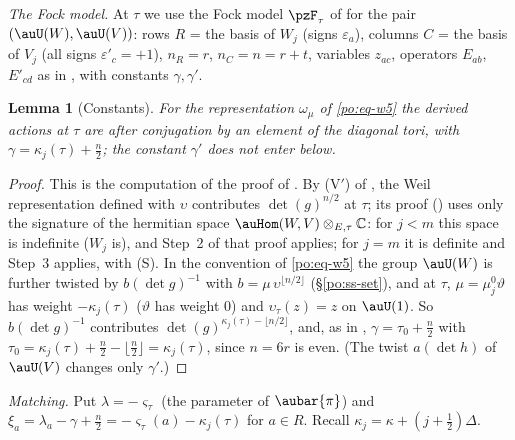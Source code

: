 \documentclass[10pt]{amsart}
\newtheorem{lemma}[theorem]{Lemma}
\theoremstyle{definition}
\theoremstyle{remark}
\newcommand{\C}{\mathbb C}
\begin{document}
\emph{The Fock model.} At $\tau$ we use the Fock model $\pzF_\tau$ of {\cite[\S3.1.4]{P49}} for the
pair $(\auU(W),\auU(V))$: rows $R$ = the basis of $W_j$ (signs $\varepsilon_a$), columns $C$ = the
basis of $V_j$ (all signs $\varepsilon'_c=+1$), $n_R=r$, $n_C=n=r+t$, variables $z_{ac}$, operators
$E_{ab}$, $E'_{cd}$ as in {\cite[(12)]{P49}}, with constants $\gamma,\gamma'$.

\begin{lemma}[Constants]\label{plf:const}
For the representation $\omega_\mu$ of \eqref{po:eq-w5} the derived actions at $\tau$ are
{\cite[(12)]{P49}} after conjugation by an element of the diagonal tori, with
$\gamma=\kappa_j(\tau)+\frac n2$; the constant $\gamma'$ does not enter below.
\end{lemma}
\begin{proof}
This is the computation of the proof of {\cite[Lemma~3.6]{P49}}. By (V$'$) of {\cite[\S3.2.7]{P49}}, the
Weil representation defined with $\upsilon$ contributes $\det(g)^{n/2}$ at $\tau$; its proof
({\cite[Theorem~3.29]{P49}}) uses only the signature of the hermitian space $\auHom(W,V)\otimes_{E,\tau}\C$:
for $j<m$ this space is indefinite ($W_j$ is), and Step~2 of that proof applies; for $j=m$ it is
definite and Step~3 applies, with (S). In the convention of \eqref{po:eq-w5} the group $\auU(W)$ is
further twisted by $b(\det g)^{-1}$ with $b=\mu\,\upsilon^{\lfloor n/2\rfloor}$ (\S\ref{po:ss-set}),
and at $\tau$, $\mu=\mu^0_j\vartheta$ has weight $-\kappa_j(\tau)$ ($\vartheta$ has weight $0$) and
$\upsilon_\tau(z)=z$ on $\auU(1)$. So $b(\det g)^{-1}$ contributes $\det(g)^{\kappa_j(\tau)-\lfloor n/2\rfloor}$, and, as in
{\cite[Lemma~3.6]{P49}}, $\gamma=\tau_0+\frac n2$ with $\tau_0=\kappa_j(\tau)+\frac n2-\lfloor\frac
n2\rfloor=\kappa_j(\tau)$, since $n=6r$ is even. (The twist $a(\det h)$ of $\auU(V)$ changes only
$\gamma'$.)
\end{proof}

\emph{Matching.} Put $\lambda=-\varsigma_\tau$ (the parameter of $\aubar{\pi}$) and
$\xi_a=\lambda_a-\gamma+\frac n2=-\varsigma_\tau(a)-\kappa_j(\tau)$ for $a\in R$. Recall
$\kappa_j=\kappa+(j+\frac12)\Delta$.
\end{document}
